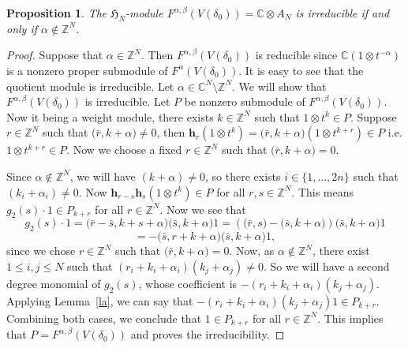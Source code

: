 \documentclass[10pt,a4paper]{amsart}
\newtheorem{proposition}{Proposition}
\newcommand{\C}{\mathbb{C}}
\renewcommand{\H}{\mathbf{h}}
\newcommand{\Ha}{\mathfrak{H}_{N}}
\newcommand{\Z}{\mathbb{Z}}
\begin{document}
\begin{proposition}\label{prop1}
   The $\Ha$-module $F^{\alpha,\beta}(V(\delta_0))=\C\otimes A_N$ is irreducible if and only if  $\alpha\notin \Z^N$.
   
   
    
    
\end{proposition}

\begin{proof}
Suppose that $\alpha\in \Z^N$. Then $F^{\alpha,\beta}(V(\delta_0))$ is reducible  since $\C(1\otimes t^{-\alpha})$ is a nonzero proper submodule of $F^\alpha(V(\delta_0))$. It is easy to see that the quotient module is irreducible.
 Let $\alpha\in \C^N\setminus \Z^N$. We will show that $F^{\alpha,\beta}(V(\delta_0))$ is irreducible. 
    Let $P$ be nonzero submodule of $F^{\alpha,\beta}(V(\delta_0))$. 
    Now it being a weight module, there exists $k\in \Z^N$ such that $1\otimes t^k\in P$. Suppose $r\in \Z^N$ such that $\bm{(}\bar{r}, k+\alpha\bm{)}\neq 0$, then $\H_r(1\otimes t^k)=\bm{(}\bar{r}, k+\alpha\bm{)}(1\otimes t^{k+r})\in P$ i.e. $1\otimes t^{k+r}\in P$. Now we choose a fixed $r\in \Z^N$ such that $\bm{(}\bar{r}, k+\alpha\bm{)}=0$. 
    
    Since $\alpha\notin \Z^N $, we will have $(k+\alpha)\neq 0$, so there exists $i\in \{1,\dots, 2n \}$ such that $(k_i+\alpha_i)\neq 0$. Now $\H_{r-s}\H_s(1\otimes t^k)\in P$ for all $r,s\in \Z^N$. This means $g_2(s)\cdot 1\in P_{k+r}$ for all $r\in \Z^N$. Now we see that
     \[ 
      g_2(s)\cdot 1=\bm{(}\bar{r}-\bar{s},k+s+\alpha\bm{)}\bm{(}\bar{s},k+\alpha\bm{)}1=(\bm{(}\bar{r},s\bm{)}-\bm{(}\bar{s},k+\alpha\bm{)})\bm{(}\bar{s},k+\alpha\bm{)}1\]
      \[=-\bm{(}\bar{s},r+k+\alpha\bm{)}\bm{(}\bar{s},k+\alpha\bm{)}1,\]
since we chose $r\in \Z^N$ such that $\bm{(}\bar{r},k+\alpha\bm{)}=0$. Now, as $\alpha\notin \Z^N$, there exist $1\leq i,j\leq N$ such that $(r_i+k_i+\alpha_i)(k_j+\alpha_j)\neq 0$. So we will have a second degree monomial of $g_2(s)$, whose coefficient is $-(r_i+k_i+\alpha_i)(k_j+\alpha_j)$. Applying Lemma~\ref{la}, we can say that $-(r_i+k_i+\alpha_i)(k_j+\alpha_j) 1\in P_{k+r}$. Combining both  cases, we conclude that $1\in P_{k+r}$ for all $r\in \Z^N$. This implies that $P=F^{\alpha,\beta}(V(\delta_0))$ and proves the irreducibility.
\end{proof}
\end{document}

